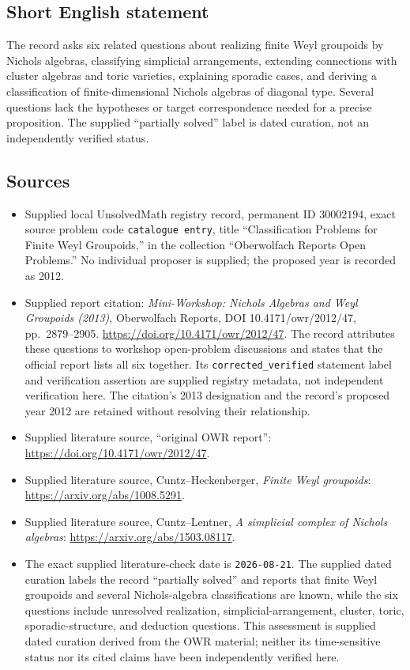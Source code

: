 \documentclass[11pt]{article}
\begin{document}
\subsection{Short English statement}
The record asks six related questions about realizing finite Weyl groupoids by Nichols algebras, classifying simplicial arrangements, extending connections with cluster algebras and toric varieties, explaining sporadic cases, and deriving a classification of finite-dimensional Nichols algebras of diagonal type. Several questions lack the hypotheses or target correspondence needed for a precise proposition. The supplied ``partially solved'' label is dated curation, not an independently verified status.
\subsection{Sources}
\begin{itemize}
\item Supplied local UnsolvedMath registry record, permanent ID \(30002194\), exact source problem code \texttt{catalogue entry}, title ``Classification Problems for Finite Weyl Groupoids,'' in the collection ``Oberwolfach Reports Open Problems.'' No individual proposer is supplied; the proposed year is recorded as 2012.
\item Supplied report citation: \emph{Mini-Workshop: Nichols Algebras and Weyl Groupoids (2013)}, Oberwolfach Reports, DOI 10.4171/owr/2012/47, pp.~2879--2905. \url{https://doi.org/10.4171/owr/2012/47}. The record attributes these questions to workshop open-problem discussions and states that the official report lists all six together. Its \texttt{corrected\_verified} statement label and verification assertion are supplied registry metadata, not independent verification here. The citation's 2013 designation and the record's proposed year 2012 are retained without resolving their relationship.
\item Supplied literature source, ``original OWR report'': \url{https://doi.org/10.4171/owr/2012/47}.
\item Supplied literature source, Cuntz--Heckenberger, \emph{Finite Weyl groupoids}: \url{https://arxiv.org/abs/1008.5291}.
\item Supplied literature source, Cuntz--Lentner, \emph{A simplicial complex of Nichols algebras}: \url{https://arxiv.org/abs/1503.08117}.
\item The exact supplied literature-check date is \texttt{2026-08-21}. The supplied dated curation labels the record ``partially solved'' and reports that finite Weyl groupoids and several Nichols-algebra classifications are known, while the six questions include unresolved realization, simplicial-arrangement, cluster, toric, sporadic-structure, and deduction questions. This assessment is supplied dated curation derived from the OWR material; neither its time-sensitive status nor its cited claims have been independently verified here.
\end{itemize}
\end{document}
